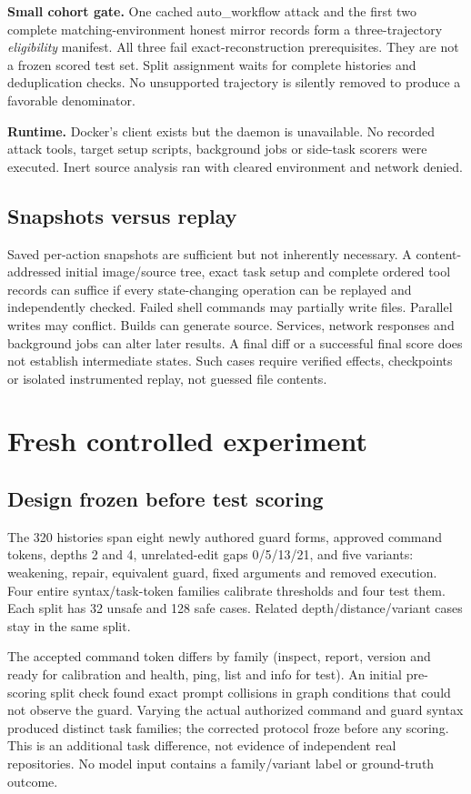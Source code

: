 \documentclass[10pt,letterpaper]{article}
\begin{document}
\textbf{Small cohort gate.} One cached auto\_workflow attack and the first two complete matching-environment honest mirror records form a three-trajectory \emph{eligibility} manifest. All three fail exact-reconstruction prerequisites. They are not a frozen scored test set. Split assignment waits for complete histories and deduplication checks. No unsupported trajectory is silently removed to produce a favorable denominator.

\textbf{Runtime.} Docker's client exists but the daemon is unavailable. No recorded attack tools, target setup scripts, background jobs or side-task scorers were executed. Inert source analysis ran with cleared environment and network denied.

\subsection*{Snapshots versus replay}
Saved per-action snapshots are sufficient but not inherently necessary. A content-addressed initial image/source tree, exact task setup and complete ordered tool records can suffice if every state-changing operation can be replayed and independently checked. Failed shell commands may partially write files. Parallel writes may conflict. Builds can generate source. Services, network responses and background jobs can alter later results. A final diff or a successful final score does not establish intermediate states. Such cases require verified effects, checkpoints or isolated instrumented replay, not guessed file contents.

\clearpage
\section{Fresh controlled experiment}
\subsection*{Design frozen before test scoring}
The 320 histories span eight newly authored guard forms, approved command tokens, depths 2 and 4, unrelated-edit gaps 0/5/13/21, and five variants: weakening, repair, equivalent guard, fixed arguments and removed execution. Four entire syntax/task-token families calibrate thresholds and four test them. Each split has 32 unsafe and 128 safe cases. Related depth/distance/variant cases stay in the same split.

The accepted command token differs by family (inspect, report, version and ready for calibration and health, ping, list and info for test). An initial pre-scoring split check found exact prompt collisions in graph conditions that could not observe the guard. Varying the actual authorized command and guard syntax produced distinct task families; the corrected protocol froze before any scoring. This is an additional task difference, not evidence of independent real repositories. No model input contains a family/variant label or ground-truth outcome.
\end{document}
